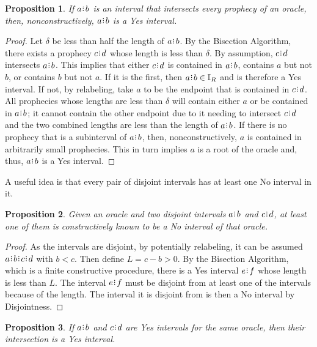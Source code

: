 \documentclass[12pt]{article}
\newtheorem{proposition}{Proposition}[section]
\begin{document}
\begin{proposition}\label{os-inter}
    If $a\rint b$ is an interval that intersects every prophecy of an oracle, then, nonconstructively, $a\rint b$ is a Yes interval. 
\end{proposition}

\begin{proof}
    Let $\delta$ be less than half the length of $a\rint b$. By the Bisection Algorithm, there exists a prophecy $c\rint d$ whose length is less than $\delta$. By assumption, $c\rint d$ intersects $a\rint b$. This implies that either $c\rint d$ is contained in $a\rint b$, contains $a$ but not $b$, or contains $b$ but not $a$. If it is the first, then $a\rint b \in \mathbb{I}_R$ and is therefore a Yes interval. If not, by relabeling, take $a$ to be the endpoint that is contained in $c\rint d$. All prophecies whose lengths are less than $\delta$ will contain either $a$ or be contained in $a\rint b$; it cannot contain the other endpoint due to it needing to intersect $c\rint d$ and the two combined lengths are less than the length of $a\rint b$. If there is no prophecy that is a subinterval of $a\rint b$, then, nonconstructively, $a$ is contained in arbitrarily small prophecies. This in turn implies $a$ is a root of the oracle and, thus, $a\rint b$ is a Yes interval. 
\end{proof}

A useful idea is that every pair of disjoint intervals has at least one No interval in it. 

\begin{proposition}
    Given an oracle and two disjoint intervals $a\rint b$ and $c\rint d$, at least one of them is constructively known to be a No interval of that oracle. 
\end{proposition}

\begin{proof}
    As the intervals are disjoint, by potentially relabeling, it can be assumed $a\rint b\rint c\rint d$ with $b < c$. Then define $L = c-b > 0$. By the Bisection Algorithm, which is a finite constructive procedure, there is a Yes interval $e\rint f$ whose length is less than $L$. The interval $e\rint f$ must be disjoint from at least one of the intervals because of the length. The interval it is disjoint from is then a No interval by Disjointness. 
\end{proof}



   
\begin{proposition}
    If $ a\rint b$ and $c\rint d$ are Yes intervals for the same oracle, then their intersection is a Yes interval. 
\end{proposition}
\end{document}
